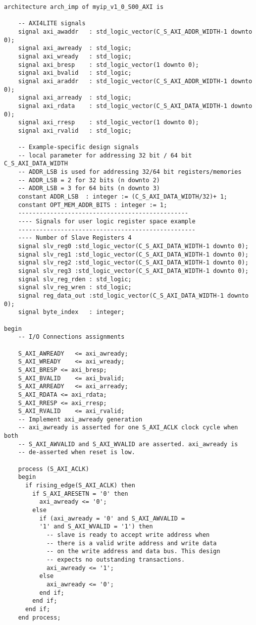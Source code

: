 \begin{lstlisting}
architecture arch_imp of myip_v1_0_S00_AXI is

	-- AXI4LITE signals
	signal axi_awaddr	: std_logic_vector(C_S_AXI_ADDR_WIDTH-1 downto 0);
	signal axi_awready	: std_logic;
	signal axi_wready	: std_logic;
	signal axi_bresp	: std_logic_vector(1 downto 0);
	signal axi_bvalid	: std_logic;
	signal axi_araddr	: std_logic_vector(C_S_AXI_ADDR_WIDTH-1 downto 0);
	signal axi_arready	: std_logic;
	signal axi_rdata	: std_logic_vector(C_S_AXI_DATA_WIDTH-1 downto 0);
	signal axi_rresp	: std_logic_vector(1 downto 0);
	signal axi_rvalid	: std_logic;

	-- Example-specific design signals
	-- local parameter for addressing 32 bit / 64 bit C_S_AXI_DATA_WIDTH
	-- ADDR_LSB is used for addressing 32/64 bit registers/memories
	-- ADDR_LSB = 2 for 32 bits (n downto 2)
	-- ADDR_LSB = 3 for 64 bits (n downto 3)
	constant ADDR_LSB  : integer := (C_S_AXI_DATA_WIDTH/32)+ 1;
	constant OPT_MEM_ADDR_BITS : integer := 1;
	------------------------------------------------
	---- Signals for user logic register space example
	--------------------------------------------------
	---- Number of Slave Registers 4
	signal slv_reg0	:std_logic_vector(C_S_AXI_DATA_WIDTH-1 downto 0);
	signal slv_reg1	:std_logic_vector(C_S_AXI_DATA_WIDTH-1 downto 0);
	signal slv_reg2	:std_logic_vector(C_S_AXI_DATA_WIDTH-1 downto 0);
	signal slv_reg3	:std_logic_vector(C_S_AXI_DATA_WIDTH-1 downto 0);
	signal slv_reg_rden	: std_logic;
	signal slv_reg_wren	: std_logic;
	signal reg_data_out	:std_logic_vector(C_S_AXI_DATA_WIDTH-1 downto 0);
	signal byte_index	: integer;

begin
	-- I/O Connections assignments

	S_AXI_AWREADY	<= axi_awready;
	S_AXI_WREADY	<= axi_wready;
	S_AXI_BRESP	<= axi_bresp;
	S_AXI_BVALID	<= axi_bvalid;
	S_AXI_ARREADY	<= axi_arready;
	S_AXI_RDATA	<= axi_rdata;
	S_AXI_RRESP	<= axi_rresp;
	S_AXI_RVALID	<= axi_rvalid;
	-- Implement axi_awready generation
	-- axi_awready is asserted for one S_AXI_ACLK clock cycle when both
	-- S_AXI_AWVALID and S_AXI_WVALID are asserted. axi_awready is
	-- de-asserted when reset is low.

	process (S_AXI_ACLK)
	begin
	  if rising_edge(S_AXI_ACLK) then 
	    if S_AXI_ARESETN = '0' then
	      axi_awready <= '0';
	    else
	      if (axi_awready = '0' and S_AXI_AWVALID =
          '1' and S_AXI_WVALID = '1') then
	        -- slave is ready to accept write address when
	        -- there is a valid write address and write data
	        -- on the write address and data bus. This design 
	        -- expects no outstanding transactions. 
	        axi_awready <= '1';
	      else
	        axi_awready <= '0';
	      end if;
	    end if;
	  end if;
	end process;


\end{lstlisting}
